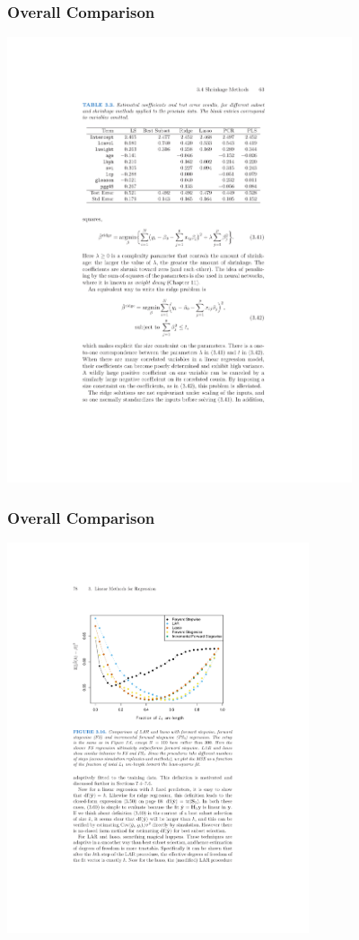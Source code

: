 \documentclass[xcolor=pdftex,dvipsnames,table,mathserif,aspectratio=169]{beamer}
\begin{document}
\begin{frame}
\frametitle{Overall Comparison}
\begin{center}
\includegraphics[width=4in]{./resources/regressiontable}
\end{center}
\end{frame}


\begin{frame}
\frametitle{Overall Comparison}
\begin{center}
\includegraphics[width=3.5in]{./resources/compareall}
\end{center}
\end{frame}
\end{document}
